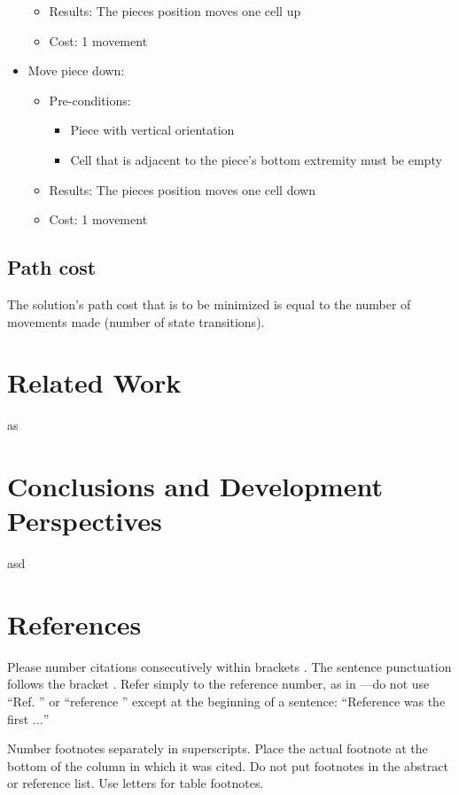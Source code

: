 \documentclass[conference]{IEEEtran}
\begin{document}
\begin{itemize}
\begin{itemize}
\begin{itemize}
        \end{itemize}
        \item Results: The pieces position moves one cell up
        \item Cost: 1 movement
    \end{itemize}
    \item Move piece down:
    \begin{itemize}
        \item Pre-conditions:
        \begin{itemize}
            \item Piece with vertical orientation
            \item Cell that is adjacent to the piece's bottom extremity must be empty
        \end{itemize}
        \item Results: The pieces position moves one cell down
        \item Cost: 1 movement
    \end{itemize}
\end{itemize}

\subsection{Path cost}
The solution's path cost that is to be minimized is equal to the number of movements made (number of state transitions).


\section{Related Work}
as

\section{Conclusions and Development Perspectives}
asd

\section*{References}

Please number citations consecutively within brackets \cite{b1}. The 
sentence punctuation follows the bracket \cite{b2}. Refer simply to the reference 
number, as in \cite{b3}---do not use ``Ref. \cite{b3}'' or ``reference \cite{b3}'' except at 
the beginning of a sentence: ``Reference \cite{b3} was the first $\ldots$''

Number footnotes separately in superscripts. Place the actual footnote at 
the bottom of the column in which it was cited. Do not put footnotes in the 
abstract or reference list. Use letters for table footnotes.
\end{document}
